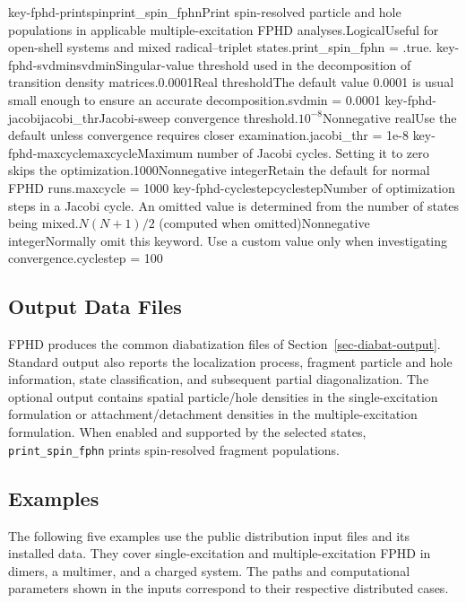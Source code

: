 \keyword
{key-fphd-printspin}{print\_spin\_fphn}{Print spin-resolved particle and hole populations in applicable multiple-excitation FPHD analyses.}{\OpOptional}{\OpLogic}{\OpFalse}{Logical}{Useful for open-shell systems and mixed radical--triplet states.}{print\_spin\_fphn = .true.}
\keyword
{key-fphd-svdmin}{svdmin}{Singular-value threshold used in the decomposition of transition density matrices.}{\OpOptional}{\OpReal}{0.0001}{Real threshold}{The default value 0.0001 is usual small enough to ensure an accurate decomposition.}{svdmin = 0.0001}
\keyword
{key-fphd-jacobi}{jacobi\_thr}{Jacobi-sweep convergence threshold.}{\OpOptional}{\OpReal}{$10^{-8}$}{Nonnegative real}{Use the default unless convergence requires closer examination.}{jacobi\_thr = 1e-8}
\keyword
{key-fphd-maxcycle}{maxcycle}{Maximum number of Jacobi cycles. Setting it to zero skips the optimization.}{\OpOptional}{\OpInt}{1000}{Nonnegative integer}{Retain the default for normal FPHD runs.}{maxcycle = 1000}
\keyword
{key-fphd-cyclestep}{cyclestep}{Number of optimization steps in a Jacobi cycle. An omitted value is determined from the number of states being mixed.}{\OpOptional}{\OpInt}{$N(N+1)/2$ (computed when omitted)}{Nonnegative integer}{Normally omit this keyword. Use a custom value only when investigating convergence.}{cyclestep = 100}

\subsection{Output Data Files}
FPHD produces the common diabatization files of Section~\ref{sec-diabat-output}. Standard output also reports the localization process, fragment particle and hole information, state classification, and subsequent partial diagonalization. The optional  output contains spatial particle/hole densities in the single-excitation formulation or attachment/detachment densities in the multiple-excitation formulation. When enabled and supported by the selected states, \texttt{print\_spin\_fphn} prints spin-resolved fragment populations.

\subsection{Examples}
The following five examples use the public distribution input files and its installed data. They cover single-excitation and multiple-excitation FPHD in dimers, a multimer, and a charged system. The paths and computational parameters shown in the inputs correspond to their respective distributed cases.


